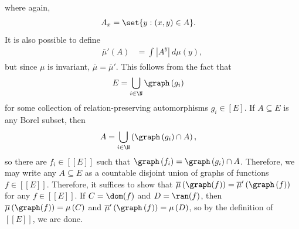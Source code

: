 \documentclass[10pt]{mypackage}
\begin{document}
where again,
\begin{align*}
  A_x &= \set{y: \left( x,y \right)\in A}.
\end{align*}
It is also possible to define
\begin{align*}
  \overline{\mu}'\left( A \right) &= \int_{}^{} \left\vert A^y \right\vert\:d\mu(y),
\end{align*}
but since $\mu$ is invariant, $ \overline{\mu} = \overline{\mu}' $. This follows from the fact that
\begin{align*}
  E &= \bigcup_{i\in \N} \graph\left( g_i \right)
\end{align*}
for some collection of relation-preserving automorphisms $g_i\in \left[ E \right]$. If $A\subseteq E$ is any Borel subset, then
\begin{align*}
  A &= \bigcup_{i\in \N} \left( \graph\left( g_i \right)\cap A \right),
\end{align*}
so there are $f_i\in \left[ \left[ E \right] \right]$ such that $\graph\left( f_i \right) = \graph\left( g_i \right)\cap A$. Therefore, we may write any $A\subseteq E$ as a countable disjoint union of graphs of functions $f\in \left[ \left[ E \right] \right]$. Therefore, it suffices to show that $ \overline{\mu}\left( \graph(f) \right) = \overline{\mu}'\left( \graph\left( f \right) \right)$ for any $f\in \left[ \left[ E \right] \right]$. If $C = \dom(f)$ and $D = \ran(f)$, then $ \overline{\mu}\left( \graph(f) \right) = \mu\left( C \right) $ and $ \overline{\mu}'\left( \graph\left( f \right) \right) = \mu\left( D \right) $, so by the definition of $\left[ \left[ E \right] \right]$, we are done.
\end{document}
